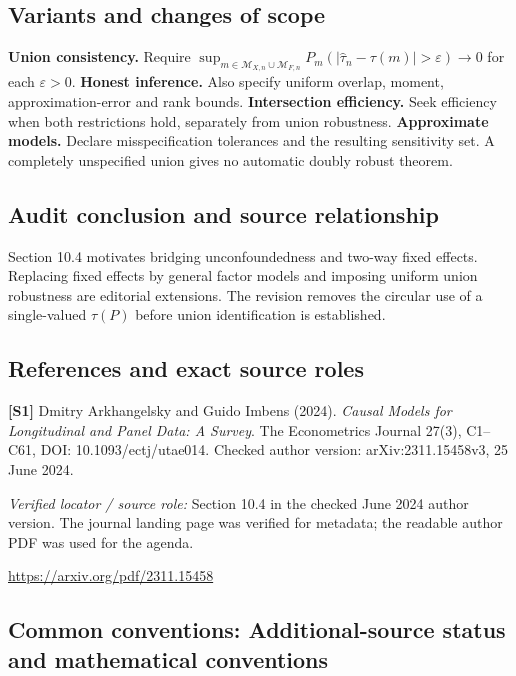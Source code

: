 \documentclass[11pt,a4paper]{article}
\begin{document}
\subsection*{Variants and changes of scope}

\textbf{Union consistency.} Require $\sup_{m\in\mathcal M_{X,n}\cup\mathcal M_{F,n}}P_m(|\widehat\tau_n-\tau(m)|>\varepsilon)\to0$ for each $\varepsilon>0$. \textbf{Honest inference.} Also specify uniform overlap, moment, approximation-error and rank bounds. \textbf{Intersection efficiency.} Seek efficiency when both restrictions hold, separately from union robustness. \textbf{Approximate models.} Declare misspecification tolerances and the resulting sensitivity set. A completely unspecified union gives no automatic doubly robust theorem.

\subsection*{Audit conclusion and source relationship}

Section 10.4 motivates bridging unconfoundedness and two-way fixed effects. Replacing fixed effects by general factor models and imposing uniform union robustness are editorial extensions. The revision removes the circular use of a single-valued $\tau(P)$ before union identification is established.

\subsection*{References and exact source roles}

{\footnotesize\raggedright
\par\noindent\textbf{[S1]} Dmitry Arkhangelsky and Guido Imbens (2024). \emph{Causal Models for Longitudinal and Panel Data: A Survey}. The Econometrics Journal 27(3), C1--C61, DOI: 10.1093/ectj/utae014. Checked author version: arXiv:2311.15458v3, 25 June 2024.\par \textit{Verified locator / source role:} Section 10.4 in the checked June 2024 author version. The journal landing page was verified for metadata; the readable author PDF was used for the agenda.\par \url{https://arxiv.org/pdf/2311.15458}\par\smallskip
}

\subsection*{Common conventions: Additional-source status and mathematical conventions}
\end{document}
